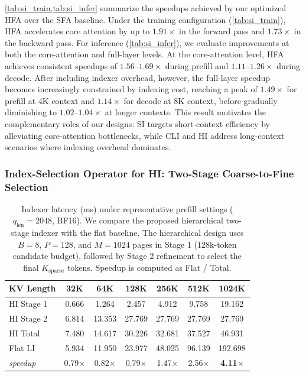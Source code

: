 \documentclass{article}
\begin{document}
\cref{tab:si_train,tab:si_infer} summarize the speedups achieved by our optimized HFA over the SFA baseline. Under the training configuration (\cref{tab:si_train}), HFA accelerates core attention by up to $1.91\times$ in the forward pass and $1.73\times$ in the backward pass. For inference (\cref{tab:si_infer}), we evaluate improvements at both the core-attention and full-layer levels. At the core-attention level, HFA achieves consistent speedups of $1.56$--$1.69\times$ during prefill and $1.11$--$1.26\times$ during decode. After including indexer overhead, however, the full-layer speedup becomes increasingly constrained by indexing cost, reaching a peak of $1.49\times$ for prefill at 4K context and $1.14\times$ for decode at 8K context, before gradually diminishing to $1.02$--$1.04\times$ at longer contexts. This result motivates the complementary roles of our designs: SI targets short-context efficiency by alleviating core-attention bottlenecks, while CLI and HI address long-context scenarios where indexing overhead dominates.


\subsubsection{Index-Selection Operator for HI: Two-Stage Coarse-to-Fine Selection}
\label{sec:hi_op}

\begin{table}[b]
\centering
\caption{Indexer latency (ms) under representative prefill settings ($q_{\text{len}} = 2048$, BF16). We compare the proposed hierarchical two-stage indexer with the flat baseline. The hierarchical design uses $B = 8$, $P = 128$, and $M = 1024$ pages in Stage 1 ($128\text{k}$-token candidate budget), followed by Stage 2 refinement to select the final $K_{\text{sparse}}$ tokens. Speedup is computed as Flat / Total.}
\label{tab:hi_infer}
\small
\begin{tabular}{lcccccc}
\toprule
\textbf{KV Length} & 32K & 64K & 128K & 256K & 512K & 1024K \\
\midrule
HI Stage 1          & 0.666 & 1.264 & 2.457 & 4.912 & 9.758 & 19.162 \\
HI Stage 2          & 6.814 & 13.353 & 27.769 & 27.769 & 27.769 & 27.769 \\
HI Total            & 7.480 & 14.617 & 30.226 & 32.681 & 37.527 & 46.931 \\
\midrule
Flat LI             & 5.934 & 11.950 & 23.977 & 48.025 & 96.139 & 192.698 \\
\emph{speedup}      & 0.79$\times$ & 0.82$\times$ & 0.79$\times$ & 1.47$\times$ & 2.56$\times$ & \textbf{4.11$\times$} \\
\bottomrule
\end{tabular}
\end{table}
\end{document}
